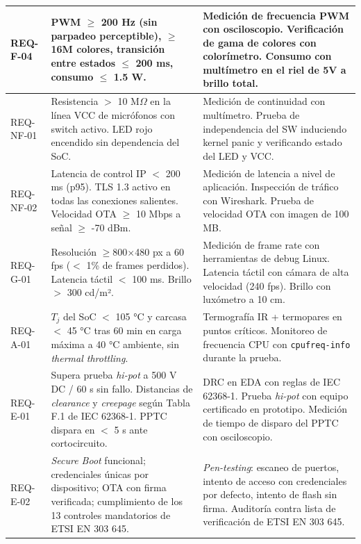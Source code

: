\documentclass[%
	paper=a4,
	twoside=false,
	parskip=half,
	chapterprefix=false,
	10pt,
	headings=normal,
	bibliography=totoc,
	listof=totoc,
	titlepage=on,
	captions=tableabove,
	draft=false,
]{scrbook}%
\begin{document}
\begin{longtable}{|>{\raggedright\arraybackslash}p{1.6cm}|
                   >{\raggedright\arraybackslash}p{6.2cm}|
                   >{\raggedright\arraybackslash}p{6.2cm}|}
REQ-F-04 &
PWM $\geq$ 200 Hz (sin parpadeo perceptible), $\geq$16M colores, transición entre estados $\leq$ 200 ms, consumo $\leq$ 1.5 W. &
Medición de frecuencia PWM con osciloscopio. Verificación de gama de colores con colorímetro. Consumo con multímetro en el riel de 5V a brillo total. \\ \hline

REQ-NF-01 &
Resistencia $>$ 10 M$\Omega$ en la línea VCC de micrófonos con switch activo. LED rojo encendido sin dependencia del SoC. &
Medición de continuidad con multímetro. Prueba de independencia del SW induciendo kernel panic y verificando estado del LED y VCC. \\ \hline

REQ-NF-02 &
Latencia de control IP $<$ 200 ms (p95). TLS 1.3 activo en todas las conexiones salientes. Velocidad OTA $\geq$ 10 Mbps a señal $\geq$ -70 dBm. &
Medición de latencia a nivel de aplicación. Inspección de tráfico con Wireshark. Prueba de velocidad OTA con imagen de 100 MB. \\ \hline

REQ-G-01 &
Resolución $\geq$800$\times$480 px a 60 fps ($<$ 1\% de frames perdidos). Latencia táctil $<$ 100 ms. Brillo $>$ 300 cd/m². &
Medición de frame rate con herramientas de debug Linux. Latencia táctil con cámara de alta velocidad (240 fps). Brillo con luxómetro a 10 cm. \\ \hline

REQ-A-01 &
$T_j$ del SoC $<$ 105 °C y carcasa $<$ 45 °C tras 60 min en carga máxima a 40 °C ambiente, sin \textit{thermal throttling}. &
Termografía IR + termopares en puntos críticos. Monitoreo de frecuencia CPU con \texttt{cpufreq-info} durante la prueba. \\ \hline

REQ-E-01 &
Supera prueba \textit{hi-pot} a 500 V DC / 60 s sin fallo. Distancias de \textit{clearance} y \textit{creepage} según Tabla F.1 de IEC 62368-1. PPTC dispara en $<$ 5 s ante cortocircuito. &
DRC en EDA con reglas de IEC 62368-1. Prueba \textit{hi-pot} con equipo certificado en prototipo. Medición de tiempo de disparo del PPTC con osciloscopio. \\ \hline

REQ-E-02 &
\textit{Secure Boot} funcional; credenciales únicas por dispositivo; OTA con firma verificada; cumplimiento de los 13 controles mandatorios de ETSI EN 303 645. &
\textit{Pen-testing}: escaneo de puertos, intento de acceso con credenciales por defecto, intento de flash sin firma. Auditoría contra lista de verificación de ETSI EN 303 645. \\ \hline

\end{longtable}
\endgroup
\end{document}
